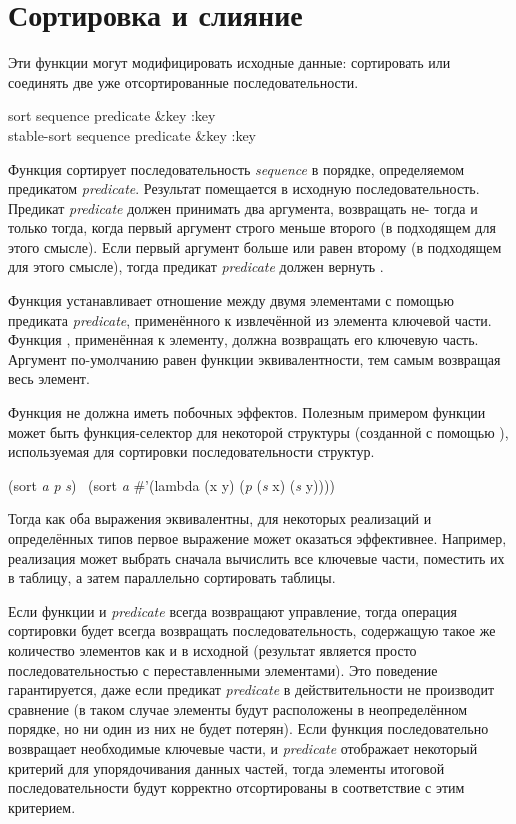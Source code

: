 \section{Сортировка и слияние}

Эти функции могут модифицировать исходные данные:
сортировать или соединять две уже отсортированные последовательности.

\begin{defun}[Функция]
sort sequence predicate &key :key \\
stable-sort sequence predicate &key :key

Функция сортирует последовательность \emph{sequence} в порядке, определяемом
предикатом \emph{predicate}. Результат помещается в исходную
последовательность. Предикат \emph{predicate} должен принимать два аргумента,
возвращать не-{\false} тогда и только тогда, когда первый аргумент строго меньше
второго (в подходящем для этого смысле).
Если первый аргумент больше или равен второму (в подходящем для этого смысле),
тогда предикат \emph{predicate} должен вернуть {\false}.

Функция  устанавливает отношение между двумя элементами с помощью
предиката \emph{predicate}, применённого к извлечённой из элемента ключевой
части. Функция , применённая к элементу, должна возвращать его ключевую
часть.
Аргумент  по-умолчанию равен функции эквивалентности, тем самым
возвращая весь элемент.

Функция  не должна иметь побочных эффектов.
Полезным примером функции  может быть функция-селектор для некоторой
структуры (созданной с помощью ), используемая для сортировки
последовательности структур.
\begin{lisp}
(sort \emph{a} \emph{p}  \emph{s})
   \EQ\ (sort \emph{a} \#'(lambda (x y) (\emph{p} (\emph{s} x) (\emph{s} y))))
\end{lisp}
Тогда как оба выражения эквивалентны, для некоторых реализаций и определённых
типов первое выражение может оказаться эффективнее.
Например, реализация может выбрать сначала вычислить все ключевые части,
поместить их в таблицу, а затем параллельно сортировать таблицы.

Если функции  и \emph{predicate} всегда возвращают управление, тогда
операция сортировки будет всегда возвращать последовательность, содержащую такое
же количество элементов как и в исходной (результат является просто
последовательностью с переставленными элементами).
Это поведение гарантируется, даже если предикат \emph{predicate} в
действительности не производит сравнение (в таком случае элементы будут
расположены в неопределённом порядке, но ни один из них не будет потерян). Если
функция  последовательно возвращает необходимые ключевые части, и
\emph{predicate} отображает некоторый критерий для упорядочивания данных частей,
тогда элементы итоговой последовательности будут корректно отсортированы в
соответствие с этим критерием.


\end{defun}
